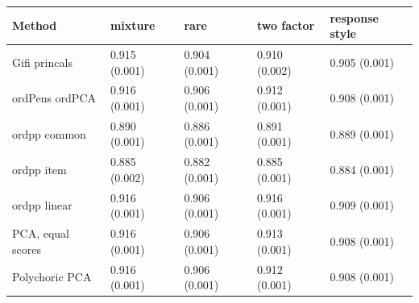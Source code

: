 \begin{tabular}{lllll}
\toprule
Method & mixture & rare & two factor & response style \\
\midrule
Gifi princals & 0.915 (0.001) & 0.904 (0.001) & 0.910 (0.002) & 0.905 (0.001) \\
ordPens ordPCA & 0.916 (0.001) & 0.906 (0.001) & 0.912 (0.001) & 0.908 (0.001) \\
ordpp common & 0.890 (0.001) & 0.886 (0.001) & 0.891 (0.001) & 0.889 (0.001) \\
ordpp item & 0.885 (0.002) & 0.882 (0.001) & 0.885 (0.001) & 0.884 (0.001) \\
ordpp linear & 0.916 (0.001) & 0.906 (0.001) & 0.916 (0.001) & 0.909 (0.001) \\
PCA, equal scores & 0.916 (0.001) & 0.906 (0.001) & 0.913 (0.001) & 0.908 (0.001) \\
Polychoric PCA & 0.916 (0.001) & 0.906 (0.001) & 0.912 (0.001) & 0.908 (0.001) \\
\bottomrule
\end{tabular}
